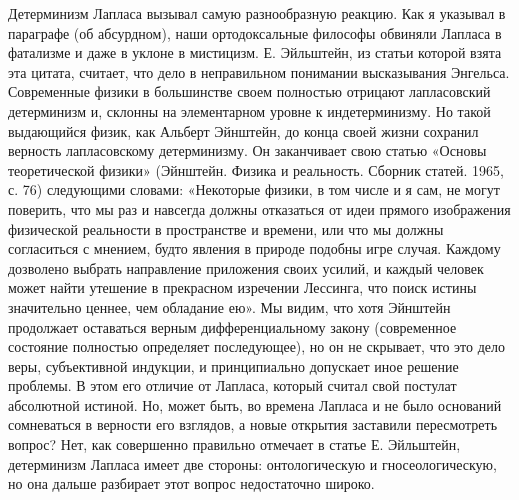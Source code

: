 Детерминизм Лапласа вызывал самую разнообразную реакцию. Как я указывал в
параграфе (об абсурдном), наши ортодоксальные философы обвиняли Лапласа в
фатализме и даже в уклоне в мистицизм. Е. Эйльштейн, из статьи которой взята
эта цитата, считает, что дело в неправильном понимании высказывания Энгельса.
Современные физики в большинстве своем полностью отрицают лапласовский
детерминизм и, склонны на элементарном уровне к индетерминизму. Но такой
выдающийся физик, как Альберт Эйнштейн, до конца своей жизни сохранил верность
лапласовскому детерминизму. Он заканчивает свою статью «Основы теоретической
физики» (Эйнштейн. Физика и реальность. Сборник статей. 1965, с. 76) следующими
словами: «Некоторые физики, в том числе и я сам, не могут поверить, что мы раз
и навсегда должны отказаться от идеи прямого изображения физической реальности
в пространстве и времени, или что мы должны согласиться с мнением, будто
явления в природе подобны игре случая. Каждому дозволено выбрать направление
приложения своих усилий, и каждый человек может найти утешение в прекрасном
изречении Лессинга, что поиск истины значительно ценнее, чем обладание ею». Мы
видим, что хотя Эйнштейн продолжает оставаться верным дифференциальному закону
(современное состояние полностью определяет последующее), но он не скрывает,
что это дело веры, субъективной индукции, и принципиально допускает иное
решение проблемы. В этом его отличие от Лапласа, который считал свой постулат
абсолютной истиной. Но, может быть, во времена Лапласа и не было оснований
сомневаться в верности его взглядов, а новые открытия заставили пересмотреть
вопрос? Нет, как совершенно правильно отмечает в статье Е. Эйльштейн,
детерминизм Лапласа имеет две стороны: онтологическую и гносеологическую, но
она дальше разбирает этот вопрос недостаточно широко.

